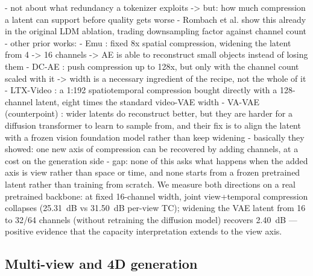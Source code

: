 - not about what redundancy a tokenizer exploits -> but: how much compression a latent can support before quality gets worse
- Rombach et al. \cite{rombach2022high} show this already in the original LDM ablation, trading downsampling factor against channel count
- other prior works:
    - Emu \cite{dai2023emu}: fixed 8x spatial compression, widening the latent from 4 -> 16 channels -> AE is able to reconstruct small objects instead of losing them
    - DC-AE \cite{chen2024deep}: push compression up to 128x, but only with the channel count scaled with it -> width is a necessary ingredient of the recipe, not the whole of it
    - LTX-Video \cite{hacohen2024ltx}: a 1:192 spatiotemporal compression bought directly with a 128-channel latent, eight times the standard video-VAE width
    - VA-VAE (counterpoint) \cite{yao2025vavae}: wider latents do reconstruct better, but they are harder for a diffusion transformer to learn to sample from, and their fix is to align the latent with a frozen vision foundation model rather than keep widening
- basically they showed: one new axis of compression can be recovered by adding channels, at a cost on the generation side
- gap: none of this asks what happens when the added axis is view rather than space or time, and none starts from a frozen pretrained latent rather than training from scratch. We measure both directions on a real pretrained backbone: at fixed 16-channel width, joint view+temporal compression collapses (25.31~dB vs 31.50~dB per-view TC); widening the VAE latent from 16 to 32/64 channels (without retraining the diffusion model) recovers 2.40~dB --- positive evidence that the capacity interpretation extends to the view axis.


\subsection{Multi-view and 4D generation}

